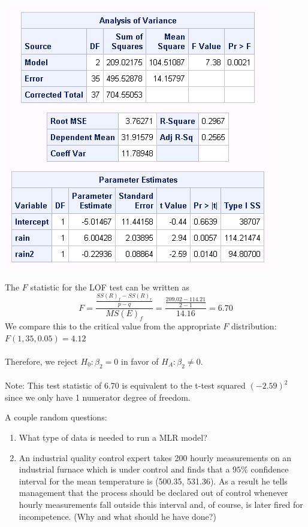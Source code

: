 \begin{center}
\includegraphics[scale=0.7]{cornquadratic}
\end{center}

The $F$ statistic for the LOF test can be written as
$$F=\frac{\frac{SS(R)_f-SS(R)_r}{p-q}}{MS(E)_f}=\frac{\frac{209.02-114.21}{2-1}}{14.16}=6.70$$
We compare this to the critical value from the appropriate $F$ distribution: $F(1,35,0.05)=4.12$\\~\\
Therefore, we reject $H_0:\beta_2=0$ in favor of $H_A:\beta_2\ne0$.\\~\\
Note: This test statistic of 6.70 is equivalent to the t-test squared $(-2.59)^2$ since we only have 1 numerator degree of freedom.

\newpage

A couple random questions:
\begin{enumerate}
\item What type of data is needed to run a MLR model?
\item An industrial quality control expert takes 200 hourly measurements on an industrial furnace which is under control and finds that a $95\%$ confidence interval for the mean temperature is (500.35, 531.36). As a result he tells management that the process should be declared out of control whenever hourly measurements fall outside this interval and, of course, is later fired for incompetence. (Why and what should he have done?)
\end{enumerate}

